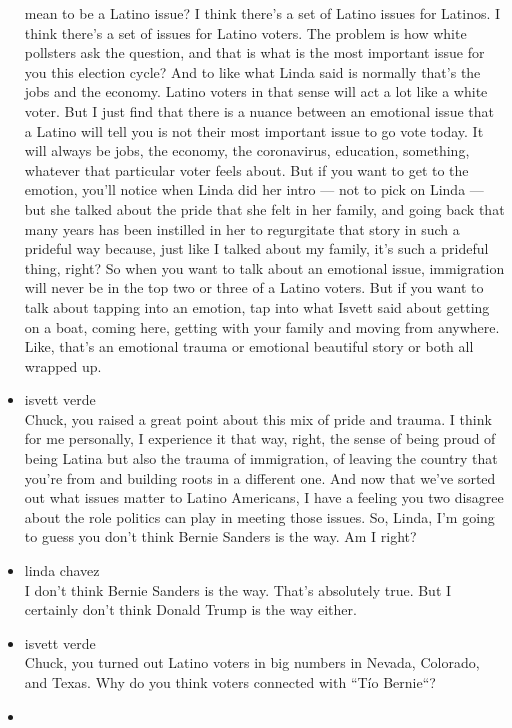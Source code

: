 \begin{itemize}
  mean to be a Latino issue? I think there's a set of Latino issues for
  Latinos. I think there's a set of issues for Latino voters. The
  problem is how white pollsters ask the question, and that is what is
  the most important issue for you this election cycle? And to like what
  Linda said is normally that's the jobs and the economy. Latino voters
  in that sense will act a lot like a white voter. But I just find that
  there is a nuance between an emotional issue that a Latino will tell
  you is not their most important issue to go vote today. It will always
  be jobs, the economy, the coronavirus, education, something, whatever
  that particular voter feels about. But if you want to get to the
  emotion, you'll notice when Linda did her intro --- not to pick on
  Linda --- but she talked about the pride that she felt in her family,
  and going back that many years has been instilled in her to
  regurgitate that story in such a prideful way because, just like I
  talked about my family, it's such a prideful thing, right? So when you
  want to talk about an emotional issue, immigration will never be in
  the top two or three of a Latino voters. But if you want to talk about
  tapping into an emotion, tap into what Isvett said about getting on a
  boat, coming here, getting with your family and moving from anywhere.
  Like, that's an emotional trauma or emotional beautiful story or both
  all wrapped up.
\item
  isvett verde\\
  Chuck, you raised a great point about this mix of pride and trauma. I
  think for me personally, I experience it that way, right, the sense of
  being proud of being Latina but also the trauma of immigration, of
  leaving the country that you're from and building roots in a different
  one. And now that we've sorted out what issues matter to Latino
  Americans, I have a feeling you two disagree about the role politics
  can play in meeting those issues. So, Linda, I'm going to guess you
  don't think Bernie Sanders is the way. Am I right?
\item
  linda chavez\\
  I don't think Bernie Sanders is the way. That's absolutely true. But I
  certainly don't think Donald Trump is the way either.
\item
  isvett verde\\
  Chuck, you turned out Latino voters in big numbers in Nevada,
  Colorado, and Texas. Why do you think voters connected with ``Tío
  Bernie``?
\item

\end{itemize}
